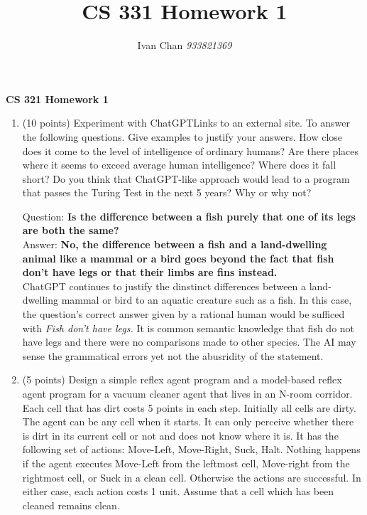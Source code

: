 \documentclass[12pt, letterpaper]{article}
\title{CS 331 Homework 1}
\author{Ivan Chan \textit{933821369}}
\begin{document}
  
\textbf{CS 321 Homework 1}

\begin{enumerate}
  \item(10 points) Experiment with ChatGPTLinks to an external site. 
  To answer the following questions. Give examples to justify your answers. 
  How close does it come to the level of intelligence of ordinary humans? 
  Are there places where it seems to exceed average human intelligence? 
  Where does it fall short? Do you think that ChatGPT-like approach would lead to a program that passes the Turing Test in the next 5 years? Why or why not?

Question: \textbf{Is the difference between a fish purely that one of its legs are both the same?}\\
Answer: \textbf{No, the difference between a fish and a land-dwelling animal like a mammal or a bird goes beyond the fact that fish don't have legs or that their limbs are fins instead.}\\
ChatGPT continues to justify the dinstinct differences between a land-dwelling mammal or bird to an aquatic creature such as a fish.
In this case, the question's correct answer given by a rational human would be sufficed with \emph{Fish don't have legs.}
It is common semantic knowledge that fish do not have legs and there were no comparisons made to other species. The AI may sense the grammatical errors yet not the abusridity of the statement.


  \item  (5 points) Design a simple reflex agent program and a model-based reflex agent program for a vacuum cleaner agent that lives in an N-room corridor. 
  Each cell that has dirt costs 5 points in each step. Initially all cells are dirty. 
  The agent can be any cell when it starts. It can only perceive  whether there is dirt in its current cell or not and does not know where it is. 
  It has the following set of actions: Move-Left, Move-Right, Suck, Halt. Nothing happens if the agent executes Move-Left from the leftmost cell, Move-right from the rightmost cell, or Suck in a clean cell. 
  Otherwise the actions are successful. In either case, each action costs 1 unit.  Assume that a cell which has been cleaned remains clean.
  

\end{enumerate}
\end{document}
